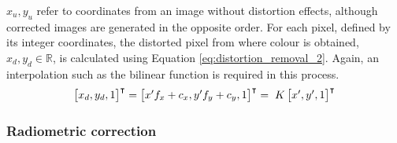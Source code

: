 $x_u, y_u$ refer to coordinates from an image without distortion effects, although corrected images are generated in the opposite order. For each pixel, defined by its integer coordinates, the distorted pixel from where colour is obtained, $x_{d}, y_{d} \in{\mathbb{R}}$, is calculated using Equation \ref{eq:distortion_removal_2}. Again, an interpolation such as the bilinear function is required in this process.
\begin{gather}
    \label{eq:distortion_removal_2}
    \begin{aligned}
        \begin{bmatrix} 
            x_d, y_d, 1
        \end{bmatrix}^\intercal 
        =
        \begin{bmatrix}
            {x'}f_x + c_x, {y'}f_y + c_y, 1
        \end{bmatrix}^\intercal
        =
        \hspace{1mm} K \begin{bmatrix}
            {x'}, {y'}, 1
        \end{bmatrix}^\intercal
    \end{aligned}
\end{gather}

\subsubsection{Radiometric correction}

